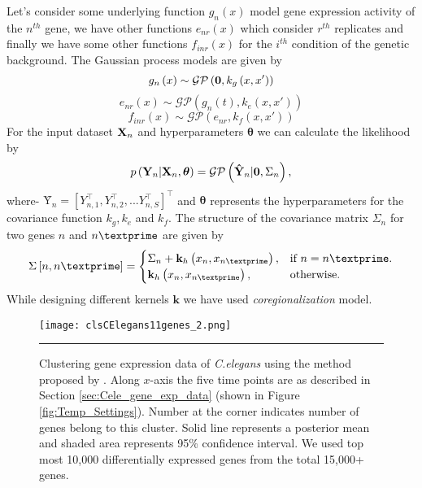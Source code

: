 Let's consider some underlying function $g_n\left(x\right)$ model gene expression activity of the $n^{th}$ gene, we have other functions $e_{nr}\left(x\right)$ which consider $r^{th}$ replicates and finally we have some other functions $f_{inr}\left(x\right)$ for the $i^{th}$ condition of the genetic background. The Gaussian process models are given by
\begin{equation} \label{eq:hGPn}
g_n\left(x\right) \sim \mathcal{GP} \left(\textbf 0,k_g\left(x,x' \right)\right)
\end{equation}
\begin{equation} \label{eq:hGPnr}
e_{nr}\left(x\right) \sim \mathcal{GP} \left(g_n\left(t\right),k_e\left(x,x' \right)\right)
\end{equation}
\begin{equation} \label{eq:hGPinr}
f_{inr}\left(x\right) \sim \mathcal{GP} \left(e_{nr},k_f\left(x,x' \right)\right)
\end{equation}
For the input dataset ${\textbf X}_n$ and hyperparameters $\boldsymbol{\theta}$ we can calculate the 
likelihood by
\begin{equation} \label{eq:LikelihoodHGP}
p\left(\textbf{Y}_n | \textbf{X}_n, \boldsymbol{\theta}\right) = \mathcal{GP} \left(\textbf {\^{Y}}_n|\textbf 0, \Sigma_n\right),
\end{equation}
where-
$\textbf {\^{Y}}_n= {\left[Y_{n,1}^\top,Y_{n,2}^\top, ... Y_{n,S}^\top\right]}^\top$ and $\boldsymbol{\theta}$ represents the hyperparameters for the covariance function $k_g,k_e$ and $k_f$. The structure of the covariance matrix $\Sigma_n$ for two genes $n$ and $n\textprime$ are given by
\begin{equation}
  \Sigma\left[n,n\textprime\right]=\begin{cases}
    \Sigma_n+\textbf{k}_h\left(x_n,x_{n\textprime}\right), & \text{if $n=n\textprime$}.\\
    \textbf{k}_h\left(x_n,x_{n\textprime}\right), & \text{otherwise}.
  \end{cases}
\end{equation}
While designing different kernels $\textbf{k}$ we have used \emph{coregionalization} model. 

\begin{figure}
	\centering
		\texttt{[image: clsCElegans11genes\_2.png]}
		\rule{35em}{0.5pt}
	\caption[Clustering Gene Expression data of \textit{C.elegans}]
		{Clustering gene expression data of \textit{C.elegans} using the method proposed by \cite{Hensman:2013}. Along $x$-axis the five time points are as described in Section \ref{sec:Cele_gene_exp_data} (shown in Figure \ref{fig:Temp_Settings}). Number at the corner indicates number of genes belong to this cluster. Solid line represents a posterior mean and shaded area represents 95\% confidence interval. We used top most 10,000 differentially expressed genes from the total 15,000+ genes.} %
	\label{fig:clsCelegans}
\end{figure}


